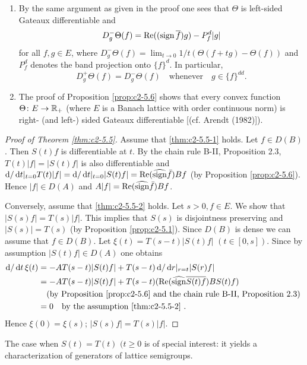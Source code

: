 \begin{remark}\label{rem:c2-5.7} 

\begin{enumerate}[\upshape (i), wide, labelindent=.5em] %
\item \label{rem:c2-5.7-1}
By the same argument as given in the proof one sees
that $\Theta$ is left-sided Gateaux differentiable and
\begin{equation*}
D^{-}_{g}\Theta(f) = \mathop{}\!\mathrm{Re}((\operatorname{sign}  \overline{f})g) - P^{d}_{f}|g|
\end{equation*}
for all $f, g \in E$, where $D^{-}_{g}\Theta(f) = \lim_{t \to 0} 1/t(\Theta(f + tg) - \Theta(f))$ and
$P^{d}_{f}$ denotes the band projection onto $\{f\}^{d}$. 
In particular,
\begin{equation}\label{eq:c2-5.10}
D^{+}_{g}\Theta(f) = D^{-}_{g}\Theta(f) \quad \text{whenever} \quad g \in \{f\}^{dd}.
\end{equation}
\item \label{rem:c2-5.7-2}
The proof of  Proposition \ref{prop:c2-5.6}   shows that every convex function $\Theta \colon E \to \mathbb{R}_{+}$
(where $E$ is a Banach lattice with order continuous norm) is right- (and left-) sided Gateaux differentiable [(cf. Arendt (1982)]).
\end{enumerate}
\end{remark}
\begin{proof}[Proof of Theorem \ref{thm:c2-5.5}]
Assume that \ref{thm:c2-5.5-1}   holds. 
Let $f \in D(B)$. 
Then $S(t)f$ is differentiable at $t$. 
By the chain rule B-II, Proposition 2.3,
$T(t)|f| = |S(t)f|$ is also differentiable and $\mathop{}\!\mathrm{d}{}/\mathop{}\!\mathrm{d}{t}|_{t=0} T(t)|f| = \mathop{}\!\mathrm{d}{}/\mathop{}\!\mathrm{d}{t}|_{t=0} |S(t)f| = \mathop{}\!\mathrm{Re}(\widehat{\operatorname{sign}}  \bar{f})Bf$ (by  Proposition \ref{prop:c2-5.6}).
Hence $|f| \in D(A)$ and $A|f| = \mathop{}\!\mathrm{Re}(\widehat{\operatorname{sign}}  \bar{f})Bf$.

Conversely, assume that \ref{thm:c2-5.5-2}   holds. 
Let $s > 0, f \in E$. 
We show that $|S(s)f| = T(s)|f|$. 
This implies that $S(s)$ is disjointness preserving and $|S(s)| = T(s)$ (by Proposition \ref{prop:c2-5.1}). 
Since $D(B)$ is dense we can assume that $f \in D(B)$. 
Let $\xi(t) = T(s-t)|S(t)f|$ $(t \in [0,s])$.
Since by assumption $|S(t)f| \in D(A)$ one obtains
\begin{align*}
\mathop{}\!\mathrm{d}{}/\mathop{}\!\mathrm{d}{t} \, \xi(t) &= -AT(s-t)|S(t)f| + T(s-t)\mathop{}\!\mathrm{d}{}/\mathop{}\!\mathrm{d}{r}|_{r=t} |S(r)f|\\
&= -AT(s-t)|S(t)f| + T(s-t)(\mathop{}\!\mathrm{Re}(\widehat{\operatorname{sign}}  \overline{S(t)f})BS(t)f)\\
&\quad \text{(by  Proposition \ref{prop:c2-5.6}   and the chain rule B-II, Proposition 2.3)
}\\
&= 0 \quad \text{by the assumption \ref{thm:c2-5.5-2}  }.
\end{align*}
Hence $\xi(0) = \xi(s)$; \ie $|S(s)f| = T(s)|f|$.
\end{proof}
The case when $S(t) = T(t)$ $(t \geq 0$ is of special interest: it yields a characterization of generators of lattice semigroups.

